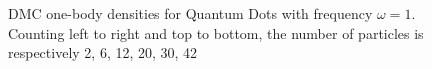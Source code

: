 \begin{figure}
\begin{center}
  \caption{DMC one-body densities for Quantum Dots with frequency $\omega=1$. Counting left to right and top to bottom, the number of particles is respectively 2, 6, 12, 20, 30, 42}
  \label{fig:OBD_DMC_QDOTS_w1}
 \end{center}
\end{figure}


\begin{figure}
 \begin{center}
   \\

\end{center}
\end{figure}
